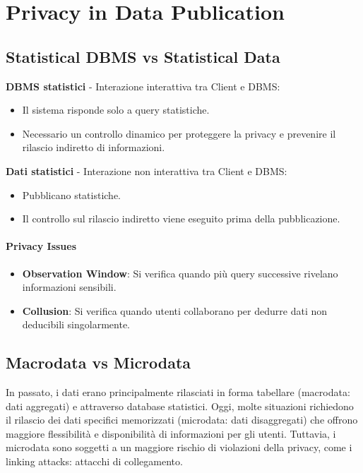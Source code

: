 \documentclass{report}
\begin{document}
\section{Privacy in Data Publication}

\subsection{Statistical DBMS vs Statistical Data}
\noindent \textbf{DBMS statistici} - Interazione interattiva tra Client e DBMS:
\begin{itemize}
    \item Il sistema risponde solo a query statistiche.
    \item Necessario un controllo dinamico per proteggere la privacy e prevenire il rilascio indiretto di informazioni.
\end{itemize}

\noindent \textbf{Dati statistici} - Interazione non interattiva tra Client e DBMS:
\begin{itemize}
    \item Pubblicano statistiche.
    \item Il controllo sul rilascio indiretto viene eseguito prima della pubblicazione.
\end{itemize}

\paragraph{Privacy Issues}
\begin{itemize}
    \item \textbf{Observation Window}: Si verifica quando più query successive rivelano informazioni sensibili.
    \item \textbf{Collusion}: Si verifica quando utenti collaborano per dedurre dati non deducibili singolarmente.
\end{itemize}

\subsection{Macrodata vs Microdata}
In passato, i dati erano principalmente rilasciati in forma tabellare (macrodata: dati aggregati) e attraverso database statistici. 
Oggi, molte situazioni richiedono il rilascio dei dati specifici memorizzati (microdata: dati disaggregati) che offrono maggiore flessibilità e disponibilità di informazioni per gli utenti. 
Tuttavia, i microdata sono soggetti a un maggiore rischio di violazioni della privacy, come i linking attacks: attacchi di collegamento.
\end{document}
